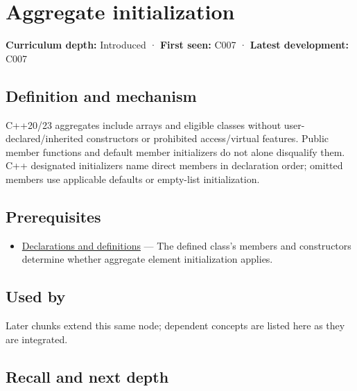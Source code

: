 \hypertarget{appendix-b7174c179542}{}\label{referencestart:appendix-b7174c179542}
\section{Aggregate initialization}\label{appendix-b7174c179542-aggregate-initialization}

\textbf{Curriculum depth:} Introduced · \textbf{First seen:} C007 · \textbf{Latest development:} C007

\begin{allmightroledefinition}

\subsection{Definition and mechanism}\label{appendix-b7174c179542-definition-and-mechanism}

C++20/23 aggregates include arrays and eligible classes without user-declared/inherited constructors or prohibited access/virtual features. Public member functions and default member initializers do not alone disqualify them. C++ designated initializers name direct members in declaration order; omitted members use applicable defaults or empty-list initialization.

\end{allmightroledefinition}

\subsection{Prerequisites}\label{appendix-b7174c179542-prerequisites}

\begin{itemize}
\tightlist
\item
  \hyperref[appendix-2e4d494c2d94]{Declarations and definitions} --- The defined class's members and constructors determine whether aggregate element initialization applies.
\end{itemize}

\subsection{Used by}\label{appendix-b7174c179542-used-by}

Later chunks extend this same node; dependent concepts are listed here as they are integrated.

\subsection{Recall and next depth}\label{appendix-b7174c179542-recall-and-next-depth}

